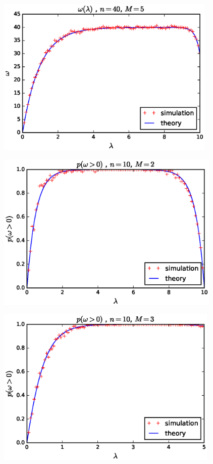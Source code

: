 \documentclass[10pt]{beamer}
\begin{document}
\begin{frame}
\begin{figure}[b]
\centering
\includegraphics[height=3in]{wl_n40_m5}
\end{figure}
\end{frame}

\begin{frame}
\begin{figure}[b]
\centering
\includegraphics[height=3in]{p_nonzero_n10_m2}
\end{figure}
\end{frame}

\begin{frame}
\begin{figure}[b]
\centering
\includegraphics[height=3in]{p_nonzero_n10_m3}
\end{figure}
\end{frame}
\end{document}
